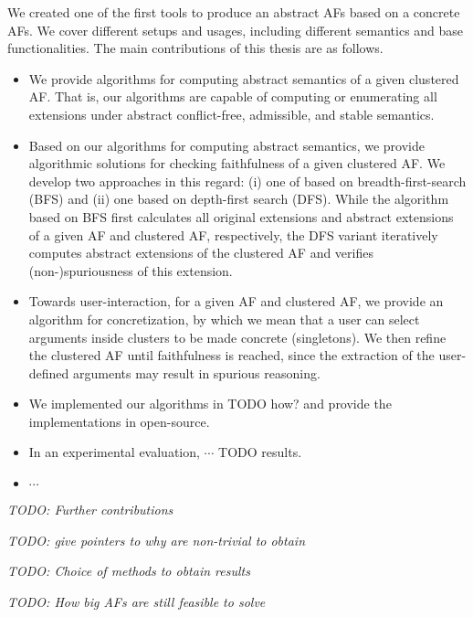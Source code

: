 We created one of the first tools \cite{Pasero2024-AFClustering-Repo} to produce an abstract AFs based on a concrete AFs. We cover different setups and usages, including different semantics and base functionalities. The main contributions of this thesis are as follows.

\begin{itemize}
    \item We provide algorithms for computing abstract semantics of a given clustered AF. That is, our algorithms are capable of computing or enumerating all extensions under abstract conflict-free, admissible, and stable semantics.

    \item Based on our algorithms for computing abstract semantics, we provide algorithmic solutions for checking faithfulness of a given clustered AF. We develop two approaches in this regard: (i) one of based on breadth-first-search (BFS) and (ii) one based on depth-first search (DFS). While the algorithm based on BFS first calculates all original extensions and abstract extensions of a given AF and clustered AF, respectively, the DFS variant iteratively computes abstract extensions of the clustered AF and verifies (non-)spuriousness of this extension.

    \item Towards user-interaction, for a given AF and clustered AF, we provide an algorithm for concretization, by which we mean that a user can select arguments inside clusters to be made concrete (singletons). We then refine the clustered AF until faithfulness is reached, since the extraction of the user-defined arguments may result in spurious reasoning.
    
    \item We implemented our algorithms in TODO how? and provide the implementations in open-source.
    \item In an experimental evaluation, $\cdots$ TODO results.
    \item $\cdots$
\end{itemize}

\noindent

\textit{TODO: Further contributions}

\textit{TODO: give pointers to why are non-trivial to obtain}

\textit{TODO: Choice of methods to obtain results}

\textit{TODO: How big AFs are still feasible to solve}

